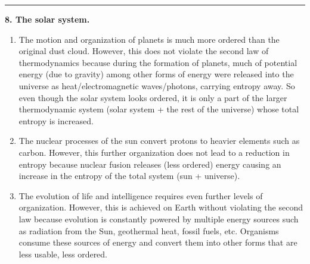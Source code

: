 \documentclass{article}
\theoremstyle{definition}
\begin{document}
\hrule

$\,$\\


\noindent \textbf{8. The solar system.}



\begin{enumerate}[label=(\alph*)]
	\item The motion and organization of planets is much more ordered than the original dust
	cloud. However, this does not violate the second law of thermodynamics because during the formation of planets, much of potential energy (due to gravity) among other forms of energy were released into the universe as heat/electromagnetic waves/photons, carrying entropy away. So even though the solar system looks ordered, it is only a part of the larger thermodynamic system (solar system + the rest of the universe) whose total entropy is increased. 
	
	\item The nuclear processes of the sun convert protons to heavier elements such as carbon. However, this further organization does not lead to a reduction in entropy because nuclear fusion releases (less ordered) energy causing an increase in the entropy of the total system (sun + universe). 
	
	
	\item The evolution of life and intelligence requires even further levels of organization. However, this is achieved on Earth without violating the second law because evolution is constantly powered by multiple energy sources such as radiation from the Sun, geothermal heat, fossil fuels, etc. Organisms consume these sources of energy and convert them into other forms that are less usable, less ordered. 
\end{enumerate}
\end{document}
